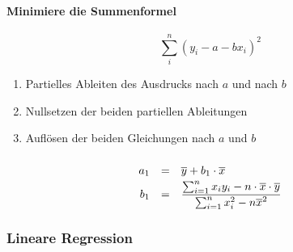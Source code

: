 \paragraph{Minimiere die Summenformel}
\begin{equation*}
\sum_i^n(y_i - a - bx_i)^2
\end{equation*}
\begin{enumerate}
\item Partielles Ableiten des Ausdrucks nach $a$ und nach $b$
\item Nullsetzen der beiden partiellen Ableitungen
\item Auflösen der beiden Gleichungen nach $a$ und $b$
\end{enumerate}
\begin{equation*}
\ra{1.7}
\begin{array}{rcl}
a_1 &=& \overline{y}+b_1\cdot\overline{x}\\
b_1 &=& \displaystyle\frac{\sum_{i=1}^n x_i y_i - n\cdot\overline{x}\cdot\overline{y}}{\sum_{i=1}^n x_i^2 - n\overline{x}^2}
\end{array}
\end{equation*}
\subsubsection{Lineare Regression}
